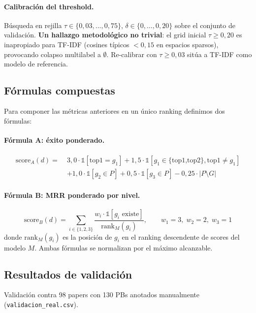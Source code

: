 \documentclass[11pt,a4paper]{article}
\begin{document}
\paragraph{Calibración del threshold.} Búsqueda en rejilla $\tau \in \{0{,}03, \ldots, 0{,}75\}$, $\delta \in \{0, \ldots, 0{,}20\}$ sobre el conjunto de validación. \textbf{Un hallazgo metodológico no trivial}: el grid inicial $\tau \geq 0{,}20$ es inapropiado para TF-IDF (cosines típicos $<0{,}15$ en espacios sparsos), provocando colapso multilabel a $\emptyset$. Re-calibrar con $\tau \geq 0{,}03$ sitúa a TF-IDF como modelo de referencia.

\subsection{Fórmulas compuestas}

Para componer las métricas anteriores en un único ranking definimos dos fórmulas:

\paragraph{Fórmula A: éxito ponderado.}
\begin{align}
\text{score}_A(d) = \;& 3{,}0 \cdot \mathbb{1}[\text{top1}=g_1] + 1{,}5 \cdot \mathbb{1}[g_1 \in \{\text{top1,top2}\}, \text{top1}\neq g_1] \nonumber \\
& + 1{,}0 \cdot \mathbb{1}[g_2 \in P] + 0{,}5 \cdot \mathbb{1}[g_3 \in P] - 0{,}25 \cdot |P \setminus G|
\end{align}

\paragraph{Fórmula B: MRR ponderado por nivel.}
\begin{equation}
\text{score}_B(d) = \sum_{i \in \{1,2,3\}} \frac{w_i \cdot \mathbb{1}[g_i \text{ existe}]}{\text{rank}_M(g_i)}, \qquad w_1=3, \; w_2=2, \; w_3=1
\end{equation}
donde $\text{rank}_M(g_i)$ es la posición de $g_i$ en el ranking descendente de scores del modelo $M$. Ambas fórmulas se normalizan por el máximo alcanzable.

\subsection{Resultados de validación}\label{sec:resval}

Validación contra 98 papers con 130 PBs anotados manualmente (\texttt{validacion\_real.csv}).
\end{document}
